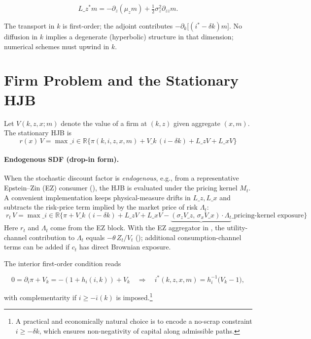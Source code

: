 \documentclass[11pt,letterpaper,oneside]{article}
\numberwithin{equation}{section}
\newcommand{\ac}[1]{{\mdseries\textsc{#1}}}
\newcommand{\R}{\mathbb{R}}
\newcommand{\1}{\mathbf{1}}
\newcommand{\Lz}{L\_z}
\newcommand{\Lx}{L\_x}
\newcommand{\Lzadj}{L\_z^{\!*}}
\newcommand{\kbar}{\bar\iota}
\begin{document}
$$
\Lzadj m = -\partial_z(\mu_z m) + \tfrac12 \sigma_z^2 \partial_{zz} m .
$$

The transport in $k$ is first-order; the adjoint contributes $-\partial_k\big[(i^*-\delta k)m\big]$. No diffusion in $k$ implies a degenerate (hyperbolic) structure in that dimension; numerical schemes must upwind in $k$.

\section{Firm Problem and the Stationary HJB}

Let $V(k,z,x;m)$ denote the value of a firm at $(k,z)$ given aggregate $(x,m)$. The stationary \ac{HJB} is
\begin{equation}
\boxed{\; r(x)\,V 
  = \max\_{i\in\R} \Big\{ \pi(k,i,z,x,m) + V\_k\,(i-\delta k) + \Lz V + \Lx V \Big\} \;}
\tag{HJB}\label{eq:HJB}
\end{equation}

\paragraph{Endogenous SDF (drop-in form).}
When the stochastic discount factor is \emph{endogenous}, e.g., from a representative Epstein--Zin (EZ) consumer (), the HJB is evaluated under the pricing kernel $M_t$. A convenient implementation keeps physical-measure drifts in $\Lz,\Lx$ and subtracts the risk-price term implied by the market price of risk $\Lambda_t$:
\begin{equation}\label{eq:HJB-EZ}
\boxed{\; r_t\,V 
  = \max\_{i\in\R} \Big\{ \pi + V\_k\,(i-\delta k) + \Lz V + \Lx V 
      - \underbrace{(\sigma_z V\_z,\, \sigma_x V\_x)\cdot\Lambda_t}\_{\text{pricing-kernel exposure}} \Big\} \;}
\end{equation}
Here $r_t$ and $\Lambda_t$ come from the EZ block. With the EZ aggregator in , the utility-channel contribution to $\Lambda_t$ equals $-\theta\,Z_t/V_t$ (); additional consumption-channel terms can be added if $c_t$ has direct Brownian exposure.

The interior first-order condition reads

$$
0=\partial_i\pi+V_k=-(1+h_i(i,k))+V_k
\quad\Longrightarrow\quad
i^*(k,z,x,m)=h_i^{-1}\!\big(V_k-1\big),
$$

with complementarity if $i\ge -\kbar(k)$ is imposed.\footnote{A practical and economically natural choice is to encode a no-scrap constraint $i\ge -\delta k$, which ensures non-negativity of capital along admissible paths.}
\end{document}
